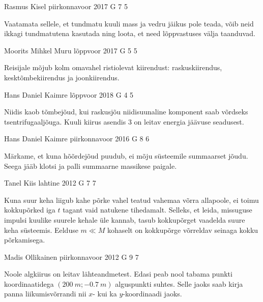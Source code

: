\documentclass[11pt]{article}
\begin{document}
{%
{Rasmus Kisel} %
{piirkonnavoor} %
{2017} %
{G 7} %
{5} %
{

\ifHint
Vaatamata sellele, et tundmatu kuuli mass ja vedru jäikus pole teada, võib neid ikkagi tundmatutena kasutada ning loota, et need lõppvastuses välja taanduvad.
\fi
}

{Moorits Mihkel Muru} %
{lõppvoor} %
{2017} %
{G 5} %
{5} %
{

\ifHint
Reisijale mõjub kolm omavahel ristiolevat kiirendust: raskuskiirendus, kesktõmbekiirendus ja joonkiirendus.
\fi
}

{Hans Daniel Kaimre} %
{lõppvoor} %
{2018} %
{G 4} %
{5} %
{

\ifHint
Niidis kaob tõmbejõud, kui raskusjõu niidisuunaline komponent saab võrdseks tsentrifugaaljõuga. Kuuli kiirus asendis 3 on leitav energia jäävuse seadusest.
\fi
}

{Hans Daniel Kaimre} %
{piirkonnavoor} %
{2016} %
{G 8} %
{6} %
{

\ifHint
Märkame, et kuna hõõrdejõud puudub, ei mõju süsteemile summaarset jõudu. Seega jääb klotsi ja palli summaarne massikese paigale.
\fi
}

{Tanel Kiis} %
{lahtine} %
{2012} %
{G 7} %
{7} %
{

\ifHint
Kuna suur keha liigub kahe põrke vahel teatud vahemaa võrra allapoole, ei toimu kokkupõrked iga $t$ tagant vaid natukene tihedamalt. Selleks, et leida, missuguse impulsi kuulike suurele kehale üle kannab, tasub kokkupõrget vaadelda suure keha süsteemis. Eelduse $m\ll M$ kohaselt on kokkupõrge võrreldav seinaga kokku põrkamisega.
\fi
}

{Madis Ollikainen} %
{piirkonnavoor} %
{2012} %
{G 9} %
{7} %
{

\ifHint
Noole algkiirus on leitav lähteandmetest. Edasi peab nool tabama punkti koordinaatidega $(\SI{200}{m};\SI{-0,7}{m})$ alguspunkti suhtes. Selle jaoks saab kirja panna liikumisvõrrandi nii $x$- kui ka $y$-koordinaadi jaoks.
\fi
}

}
\end{document}
